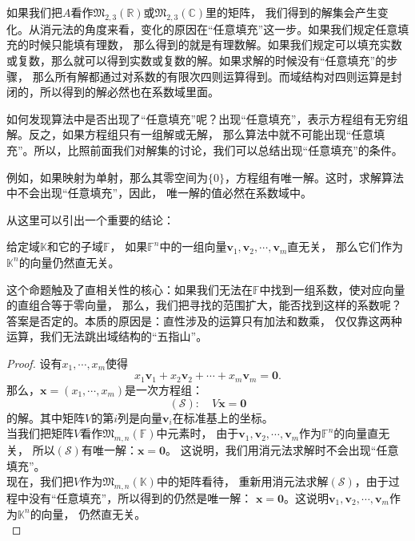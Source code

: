 \documentclass[12pt,UTF8,fontset=none]{ctexbook}
\begin{document}
如果我们把$A$看作$\mathfrak{M}_{2,3}(\mathbb{R})$或$\mathfrak{M}_{2,3}(\mathbb{C})$里的矩阵，
我们得到的解集会产生变化。从消元法的角度来看，变化的原因在“任意填充”这一步。如果我们规定任意填充的时候只能填有理数，
那么得到的就是有理数解。如果我们规定可以填充实数或复数，那么就可以得到实数或复数的解。如果求解的时候没有“任意填充”的步骤，
那么所有解都通过对系数的有限次四则运算得到。而域结构对四则运算是封闭的，所以得到的解必然也在系数域里面。

如何发现算法中是否出现了“任意填充”呢？出现“任意填充”，表示方程组有无穷组解。反之，如果方程组只有一组解或无解，
那么算法中就不可能出现“任意填充”。所以，比照前面我们对解集的讨论，我们可以总结出现“任意填充”的条件。

例如，如果映射为单射，那么其零空间为$\{0\}$，方程组有唯一解。这时，求解算法中不会出现“任意填充”，因此，
唯一解的值必然在系数域中。

从这里可以引出一个重要的结论：
\begin{pp}\label{pp:5_0}
    给定域$\mathbb{K}$和它的子域$\mathbb{F}$，
    如果$\mathbb{F}^n$中的一组向量$\mathbf{v}_1, \mathbf{v}_2, \cdots , \mathbf{v}_m$直无关，
    那么它们作为$\mathbb{K}^n$的向量仍然直无关。
\end{pp}
这个命题触及了直相关性的核心：如果我们无法在$\mathbb{F}$中找到一组系数，使对应向量的直组合等于零向量，
那么，我们把寻找的范围扩大，能否找到这样的系数呢？答案是否定的。本质的原因是：直性涉及的运算只有加法和数乘，
仅仅靠这两种运算，我们无法跳出域结构的“五指山”。

\begin{proof} %
设有$x_1, \cdots, x_m$使得
$$ x_1\mathbf{v}_1 + x_2 \mathbf{v}_2 + \cdots + x_m \mathbf{v}_m = \mathbf{0}. $$
那么，$\mathbf{x} = (x_1, \cdots, x_m)$是一次方程组：
$$ (\mathcal{S}): \quad V\mathbf{x} = \mathbf{0} $$
的解。其中矩阵$V$的第$i$列是向量$\mathbf{v}_i$在标准基上的坐标。\\
当我们把矩阵$V$看作$\mathfrak{M}_{m,n}(\mathbb{F})$中元素时，
由于$\mathbf{v}_1, \mathbf{v}_2, \cdots , \mathbf{v}_m$作为$\mathbb{F}^n$的向量直无关，
所以$(\mathcal{S})$有唯一解：$\mathbf{x} = \mathbf{0}$。
这说明，我们用消元法求解时不会出现“任意填充”。\\
现在，我们把$V$作为$\mathfrak{M}_{m,n}(\mathbb{K})$中的矩阵看待，
重新用消元法求解$(\mathcal{S})$，由于过程中没有“任意填充”，所以得到的仍然是唯一解：
$\mathbf{x} = \mathbf{0}$。这说明$\mathbf{v}_1, \mathbf{v}_2, \cdots , \mathbf{v}_m$作为$\mathbb{K}^n$的向量，
仍然直无关。\\
\end{proof}
\end{document}
